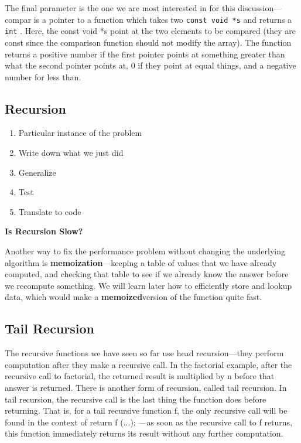 \documentclass[11pt, a4paper]{article}
\begin{document}
The final parameter is the one we are most interested in for this discussion—compar is a pointer to a function which takes two \texttt{const void *s} and returns a \texttt{int} . Here, the const void *s point at the two elements to be compared (they are const since the comparison function should not modify the array). The function returns a positive number if the first pointer points at something greater than what the second pointer points at, 0 if they point at equal things, and a negative number for less than.


\subsection{Recursion}%
\label{sub:recursion}

\begin{enumerate}
  \item Particular instance of the problem
  \item Write down what we just did
  \item Generalize
  \item Test
  \item Translate to code
\end{enumerate}



\textbf{Is Recursion Slow?}

Another way to fix the performance problem without changing the underlying algorithm is \textbf{memoization}—keeping a table of values that we have already computed, and checking that table to see if we already know the answer before we recompute something. We will learn later how to efficiently store and lookup data, which would make a \textbf{memoized}version of the function quite fast.




\subsection{Tail Recursion}%
\label{sub:tail_recursion}

The recursive functions we have seen so far use head recursion—they perform computation after they make a recursive call. In the factorial example, after the recursive call to factorial, the returned result is multiplied by n before that answer is returned. There is another form of recursion, called tail recursion. In tail recursion, the recursive call is the last thing the function does before returning. That is, for a tail recursive function f, the only recursive call will be found in the context of return f (...); —as soon as the recursive call to f returns, this function immediately returns its result without any further computation.
\end{document}

